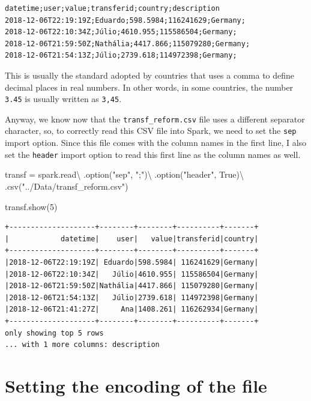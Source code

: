 \documentclass[
  11pt,
  letterpaper,
  DIV=11,
  numbers=noendperiod]{scrreprt}
\newenvironment{Shaded}{\begin{snugshade}}{\end{snugshade}}
\newcommand{\DecValTok}[1]{\textcolor[rgb]{0.68,0.00,0.00}{#1}}
\newcommand{\NormalTok}[1]{\textcolor[rgb]{0.00,0.23,0.31}{#1}}
\newcommand{\OperatorTok}[1]{\textcolor[rgb]{0.37,0.37,0.37}{#1}}
\newcommand{\StringTok}[1]{\textcolor[rgb]{0.13,0.47,0.30}{#1}}
\newcommand{\VariableTok}[1]{\textcolor[rgb]{0.07,0.07,0.07}{#1}}
\begin{document}
\begin{verbatim}
datetime;user;value;transferid;country;description
2018-12-06T22:19:19Z;Eduardo;598.5984;116241629;Germany;
2018-12-06T22:10:34Z;Júlio;4610.955;115586504;Germany;
2018-12-06T21:59:50Z;Nathália;4417.866;115079280;Germany;
2018-12-06T21:54:13Z;Júlio;2739.618;114972398;Germany;
\end{verbatim}

This is usually the standard adopted by countries that uses a comma to
define decimal places in real numbers. In other words, in some
countries, the number \texttt{3.45} is usually written as \texttt{3,45}.

Anyway, we know now that the \texttt{transf\_reform.csv} file uses a
different separator character, so, to correctly read this CSV file into
Spark, we need to set the \texttt{sep} import option. Since this file
comes with the column names in the first line, I also set the
\texttt{header} import option to read this first line as the column
names as well.

\begin{Shaded}
\begin{Highlighting}[]
\NormalTok{transf }\OperatorTok{=}\NormalTok{ spark.read}\OperatorTok{\textbackslash{}}
\NormalTok{  .option(}\StringTok{"sep"}\NormalTok{, }\StringTok{";"}\NormalTok{)}\OperatorTok{\textbackslash{}}
\NormalTok{  .option(}\StringTok{"header"}\NormalTok{, }\VariableTok{True}\NormalTok{)}\OperatorTok{\textbackslash{}}
\NormalTok{  .csv(}\StringTok{"../Data/transf\_reform.csv"}\NormalTok{)}
  
\NormalTok{transf.show(}\DecValTok{5}\NormalTok{)}
\end{Highlighting}
\end{Shaded}

\begin{verbatim}
+--------------------+--------+--------+----------+-------+
|            datetime|    user|   value|transferid|country|
+--------------------+--------+--------+----------+-------+
|2018-12-06T22:19:19Z| Eduardo|598.5984| 116241629|Germany|
|2018-12-06T22:10:34Z|   Júlio|4610.955| 115586504|Germany|
|2018-12-06T21:59:50Z|Nathália|4417.866| 115079280|Germany|
|2018-12-06T21:54:13Z|   Júlio|2739.618| 114972398|Germany|
|2018-12-06T21:41:27Z|     Ana|1408.261| 116262934|Germany|
+--------------------+--------+--------+----------+-------+
only showing top 5 rows
... with 1 more columns: description
\end{verbatim}

\section{Setting the encoding of the
file}\label{setting-the-encoding-of-the-file}
\end{document}
